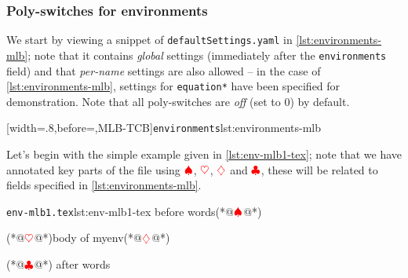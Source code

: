 \subsubsection{Poly-switches for environments}\label{sec:modifylinebreaks-environments}
 We start by viewing a snippet of \texttt{defaultSettings.yaml} in
 \cref{lst:environments-mlb}; note that it contains \emph{global} settings (immediately
 after the \texttt{environments} field) and that \emph{per-name} settings are also
 allowed -- in the case of \cref{lst:environments-mlb}, settings for \texttt{equation*}
 have been specified for demonstration. Note that all poly-switches are \emph{off} (set
 to 0) by default.   

 [width=.8\linewidth,before=\centering,MLB-TCB]{\texttt{environments}}{lst:environments-mlb}

 Let's begin with the simple example given in \cref{lst:env-mlb1-tex}; note that we have
 annotated key parts of the file using $\color{red}\spadesuit$, $\color{red}\heartsuit$,
 $\color{red}\diamondsuit$ and $\color{red}\clubsuit$, these will be related to fields
 specified in \cref{lst:environments-mlb}. 

 \begin{cmhlistings}[style=tcblatex,escapeinside={(*@}{@*)}]{\texttt{env-mlb1.tex}}{lst:env-mlb1-tex}
before words(*@$\color{red}\spadesuit$@*) \begin{myenv}(*@$\color{red}\heartsuit$@*)body of myenv(*@$\color{red}\diamondsuit$@*)\end{myenv}(*@$\color{red}\clubsuit$@*) after words
\end{cmhlistings}

